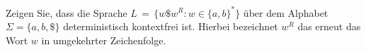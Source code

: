 
\begin{exercise}
	
Zeigen Sie, dass die Sprache
$L \, = \, \bigl\{ w \$ w^R : w \in \{a,b\}^* \bigr\}$
\"uber dem Alphabet $\Sigma = \{a,b,\$\}$ deterministisch  
kontextfrei ist. Hierbei bezeichnet $w^R$ das
erneut das Wort $w$ in umgekehrter Zeichenfolge.

\end{exercise}
